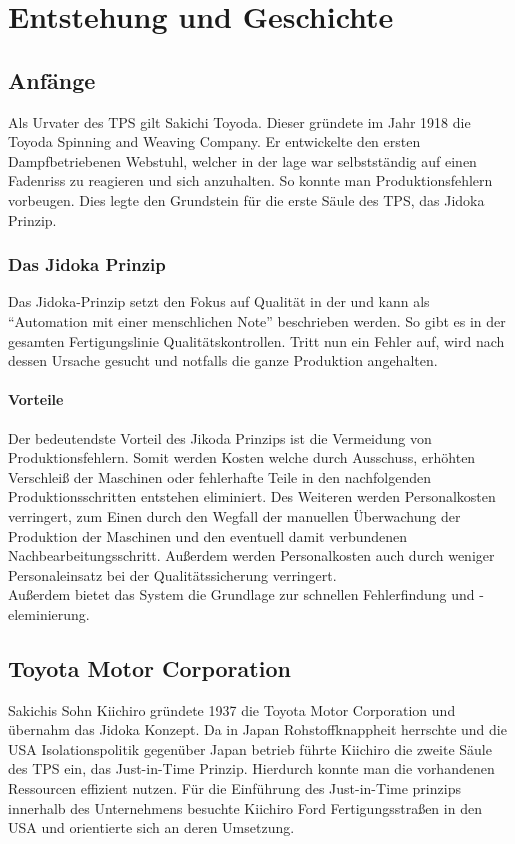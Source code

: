 \documentclass[00_ToyotaProduktionssystem.tex]{subfiles}
\begin{document}
\chapter{Entstehung und Geschichte}
\label{chap:ENTSTEHUNG}
\section{Anfänge}
Als Urvater des TPS gilt Sakichi Toyoda. Dieser gründete im Jahr 1918 die Toyoda Spinning and Weaving Company. Er entwickelte den ersten Dampfbetriebenen Webstuhl, welcher in der lage war selbstständig auf einen Fadenriss zu reagieren und sich anzuhalten. So konnte man Produktionsfehlern vorbeugen. Dies legte den Grundstein für die erste Säule des TPS, das Jidoka Prinzip.
\subsection{Das Jidoka Prinzip}
Das Jidoka-Prinzip setzt den Fokus auf Qualität in der  und kann als “Automation mit einer menschlichen Note” beschrieben werden. So gibt es in der gesamten Fertigungslinie Qualitätskontrollen. Tritt nun ein Fehler auf, wird nach dessen Ursache gesucht und notfalls die ganze Produktion angehalten.
\subsubsection{Vorteile}
Der bedeutendste Vorteil des Jikoda Prinzips ist die Vermeidung von Produktionsfehlern. Somit werden Kosten   welche durch Ausschuss, erhöhten Verschleiß der Maschinen oder fehlerhafte Teile in den nachfolgenden Produktionsschritten entstehen eliminiert. Des Weiteren werden Personalkosten verringert, zum Einen durch den Wegfall der manuellen Überwachung der Produktion der Maschinen und den eventuell damit verbundenen Nachbearbeitungsschritt. Außerdem werden Personalkosten auch durch weniger Personaleinsatz bei der Qualitätssicherung verringert.\\
Außerdem bietet das System die Grundlage zur schnellen Fehlerfindung und -eleminierung.
\section{Toyota Motor Corporation}
Sakichis Sohn Kiichiro gründete 1937 die Toyota Motor Corporation und übernahm das Jidoka Konzept. Da in Japan Rohstoffknappheit herrschte und die USA Isolationspolitik gegenüber Japan betrieb führte Kiichiro die zweite Säule des TPS ein, das Just-in-Time Prinzip. Hierdurch konnte man die vorhandenen Ressourcen effizient nutzen. Für die Einführung des Just-in-Time prinzips innerhalb des Unternehmens besuchte Kiichiro Ford Fertigungsstraßen in den USA und orientierte sich an deren Umsetzung.
\end{document}
